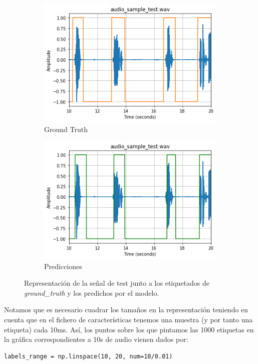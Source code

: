 \documentclass[11pt]{article}
\begin{document}
\begin{figure}[h!]
     \centering
     \begin{subfigure}[b]{0.49\textwidth}
         \centering
         \includegraphics[width=\textwidth]{img/eval_gt}
         \caption{Ground Truth}
     \end{subfigure}
     \hfill
     \begin{subfigure}[b]{0.49\textwidth}
         \centering
         \includegraphics[width=\textwidth]{img/eval_preds}
         \caption{Predicciones}
     \end{subfigure}
        \caption{Representación de la señal de test junto a los etiquetados de \textit{ground\_truth} y los predichos por el modelo.}
        \label{fig:labels}
\end{figure}

Notamos que es necesario cuadrar los tamaños en la representación teniendo en cuenta que en el fichero de características tenemos una muestra (y por tanto una etiqueta) cada 10ms. Así, los puntos sobre los que pintamos las 1000 etiquetas en la gráfica correspondientes a 10s de audio vienen dados por:
\begin{verbatim}
labels_range = np.linspace(10, 20, num=10/0.01)
\end{verbatim}
\end{document}
